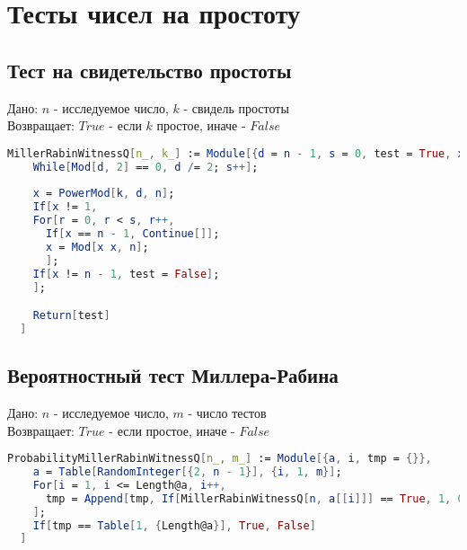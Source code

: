 \chapter{Тесты чисел на простоту}

\section{Тест на свидетельство простоты}

  Дано: {$n$} - исследуемое число, {$k$} - свидель простоты \\
  Возвращает: {$True$} - если {$k$} простое, иначе - {$False$}

\begin{lstlisting}[language=Mathematica,caption={Тест Миллера-Рабина}]
  MillerRabinWitnessQ[n_, k_] := Module[{d = n - 1, s = 0, test = True, x, a, r},
    While[Mod[d, 2] == 0, d /= 2; s++];
    
    x = PowerMod[k, d, n];
    If[x != 1,
    For[r = 0, r < s, r++,
      If[x == n - 1, Continue[]];
      x = Mod[x x, n];
      ];
    If[x != n - 1, test = False];
    ];

    Return[test]
  ]
\end{lstlisting}

\section{Вероятностный тест Миллера-Рабина}

  Дано: {$n$} - исследуемое число, {$m$} - число тестов \\
  Возвращает: {$True$} - если простое, иначе - {$False$}

\begin{lstlisting}[language=Mathematica,caption={Вероятностный тест Миллера-Рабина}]
  ProbabilityMillerRabinWitnessQ[n_, m_] := Module[{a, i, tmp = {}},
    a = Table[RandomInteger[{2, n - 1}], {i, 1, m}];
    For[i = 1, i <= Length@a, i++,
      tmp = Append[tmp, If[MillerRabinWitnessQ[n, a[[i]]] == True, 1, 0]];
    ];
    If[tmp == Table[1, {Length@a}], True, False]
  ] 
\end{lstlisting}
